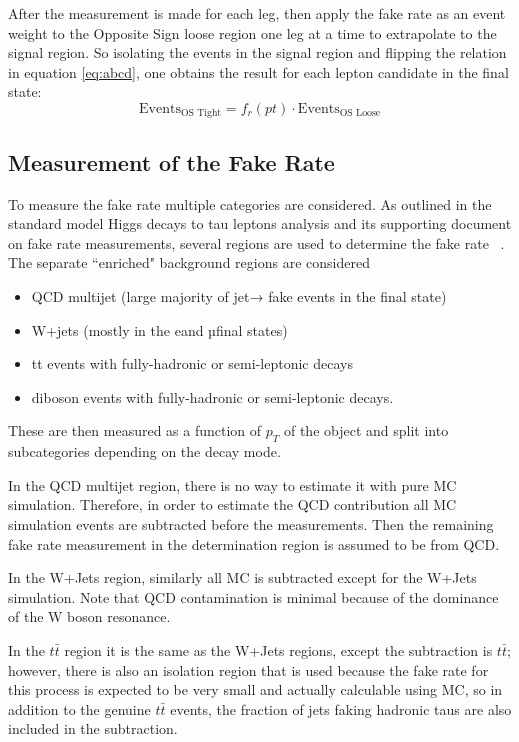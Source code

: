After the measurement is made for each leg, then apply the fake rate as an event weight to the Opposite Sign loose region one leg at a time to extrapolate to the signal region. So isolating the events in the signal region and flipping the relation in equation \ref{eq:abcd}, one obtains the result for each lepton candidate in the final state: 
\begin{equation}
\text{Events}_\text{OS Tight} = f_r(pt)\cdot \text{Events}_\text{OS Loose}  
\end{equation}

\subsection{Measurement of the Fake Rate}
To measure the fake rate multiple categories are considered. As outlined in the standard model Higgs decays to tau leptons analysis and its supporting document on fake rate measurements, several regions are used to determine the fake rate ~\cite{AN16355}. The separate ``enriched" background regions are considered 
\begin{itemize}
	\item QCD multijet (large majority of jet→ \tauh fake events in the \tauh \tauh final state)
	\item W+jets (mostly in the e\tauh and µ\tauh final states)
	\item tt events with fully-hadronic or semi-leptonic decays
	\item diboson events with fully-hadronic or semi-leptonic decays.
\end{itemize} 

These are then measured as a function of $p_T$ of the object and split into subcategories depending on the decay mode.  

In the QCD multijet region, there is no way to estimate it with pure MC simulation. Therefore, in order to estimate the QCD contribution all MC simulation events are subtracted before the measurements. Then the remaining fake rate measurement in the determination region is assumed to be from QCD.

In the W+Jets region, similarly all MC is subtracted except for the W+Jets simulation. Note that QCD contamination is minimal because of the dominance of the W boson resonance. 

In the $t\bar{t}$ region it is the same as the W+Jets regions, except the subtraction is $t\bar{t}$; however, there is also an isolation region that is used because the fake rate for this process is expected to be very small and actually calculable using MC, so in addition to the genuine $t\bar{t}$ events, the fraction of jets faking hadronic taus are also included in the subtraction. 





